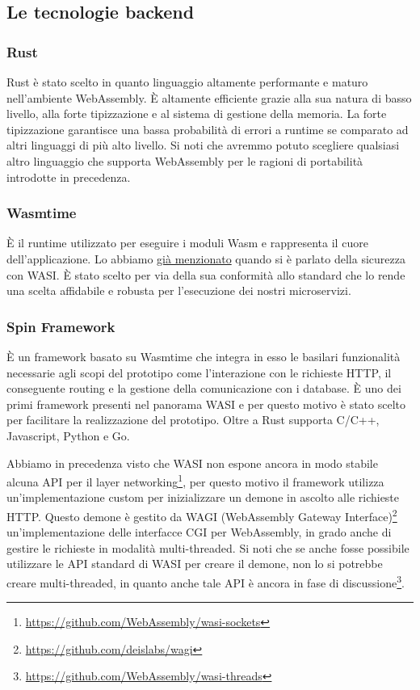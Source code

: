 \subsection{Le tecnologie backend}
\subsubsection{Rust}
Rust è stato scelto in quanto linguaggio altamente performante e maturo nell'ambiente WebAssembly. È altamente
efficiente grazie alla sua natura di basso livello, alla forte tipizzazione e al sistema di gestione della memoria. La
forte tipizzazione garantisce una bassa probabilità di errori a runtime se comparato ad altri linguaggi di più alto
livello. Si noti che avremmo potuto scegliere qualsiasi altro linguaggio che supporta WebAssembly per le ragioni di
portabilità introdotte in precedenza.

\subsubsection{Wasmtime}
È il runtime utilizzato per eseguire i moduli Wasm e rappresenta il cuore dell'applicazione. Lo abbiamo
\hyperref[sec:capability-example]{già menzionato} quando si è parlato della sicurezza con WASI. È stato scelto per via
della sua conformità allo standard che lo rende una scelta affidabile e robusta per l'esecuzione dei nostri
microservizi.

\subsubsection{Spin Framework}
\label{sec:spin-framework}
È un framework basato su Wasmtime che integra in esso le basilari funzionalità necessarie agli scopi del prototipo come
l'interazione con le richieste HTTP, il conseguente routing e la gestione della comunicazione con i database. È uno dei
primi framework presenti nel panorama WASI e per questo motivo è stato scelto per facilitare la realizzazione del
prototipo. Oltre a Rust supporta C/C++, Javascript, Python e Go.

Abbiamo in precedenza visto che WASI non espone ancora in modo stabile alcuna API per il layer
networking\footnote{\url{https://github.com/WebAssembly/wasi-sockets}}, per questo motivo il framework utilizza
un'implementazione custom per inizializzare un demone in ascolto alle richieste HTTP. Questo demone è gestito da WAGI
(WebAssembly Gateway Interface)\footnote{\url{https://github.com/deislabs/wagi}} un'implementazione delle interfacce
CGI\cite{RFC3875} per WebAssembly, in grado anche di gestire le richieste in modalità multi-threaded. Si noti che se
anche fosse possibile utilizzare le API standard di WASI per creare il demone, non lo si potrebbe creare multi-threaded,
in quanto anche tale API è ancora in fase di discussione\footnote{\url{https://github.com/WebAssembly/wasi-threads}}.

